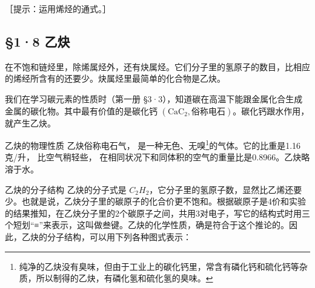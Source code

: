 ［提示：运用烯烃的通式。］

\subsection{§1·8 乙炔}

在不饱和链烃里，除烯属烃外，还有炔属烃。它们分子里的氢原子的数目，比相应的烯经所含有的还要少。炔属烃里最简单的化合物是乙炔。

我们在学习碳元素的性质时（第一册
§3·3），知道碳在高温下能跟金属化合生成金属的碳化物。其中最有价值的是碳化钙
\(\left(\mathrm{CaC}_{2},\text{俗称电石}\right)\)。碳化钙跟水作用，就产生乙炔。

乙炔的物理性质 乙炔俗称电石气，
是一种无色、无嗅\footnote{纯净的乙炔没有臭味，但由于工业上的碳化钙里，常含有磷化钙和硫化钙等杂质，所以制得的乙炔，有磷化氢和硫化氢的臭味。}的气体。它的比重是1.16克/升，
比空气稍轻些，
在相同状况下和同体积的空气的重量比是0.8966。乙炔略溶于水。

乙炔的分子结构 乙炔的分子式是
\(C_{2}H_{2}\)，它分子里的氢原子数，显然比乙烯还要少。也就是说，乙炔分子里的碳原子的化合价更不饱和。根据碳原子是4价和实验的结果推知，在乙炔分子里的2个碳原子之间，共用3对电子，写它的结构式时用三个短划``≡''来表示，这叫做叁键。乙炔的化学性质，确是符合于这个推论的。因此，乙炔的分子结构，可以用下列各种图式表示：


